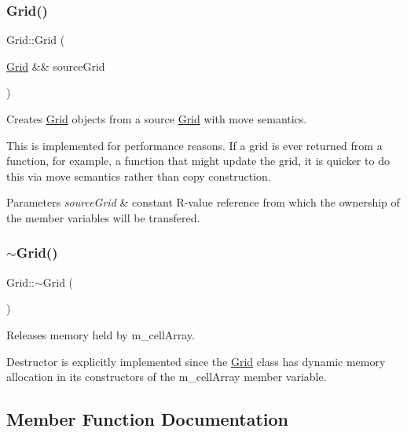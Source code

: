 \subsubsection{\texorpdfstring{Grid()}{Grid()}\hspace{0.1cm}{\footnotesize\ttfamily [5/5]}}
{\footnotesize\ttfamily Grid\+::\+Grid (\begin{DoxyParamCaption}\item[{\hyperlink{class_grid}{Grid} \&\&}]{source\+Grid }\end{DoxyParamCaption})}



Creates \hyperlink{class_grid}{Grid} objects from a source \hyperlink{class_grid}{Grid} with move semantics. 

This is implemented for performance reasons. If a grid is ever returned from a function, for example, a function that might update the grid, it is quicker to do this via move semantics rather than copy construction.


\begin{DoxyParams}{Parameters}
{\em source\+Grid} & constant R-\/value reference from which the ownership of the member variables will be transfered. \\
\hline
\end{DoxyParams}
\mbox{\label{class_grid_a3661d0a7f998caaaf8627d7a67072116}} 
\subsubsection{\texorpdfstring{$\sim$\+Grid()}{~Grid()}}
{\footnotesize\ttfamily Grid\+::$\sim$\+Grid (\begin{DoxyParamCaption}{ }\end{DoxyParamCaption})}



Releases memory held by m\+\_\+cell\+Array. 

Destructor is explicitly implemented since the \hyperlink{class_grid}{Grid} class has dynamic memory allocation in its constructors of the m\+\_\+cell\+Array member variable. 

\subsection{Member Function Documentation}
\mbox{\label{class_grid_a50f4c0db20b466c84a1d65004e51642e}} 

